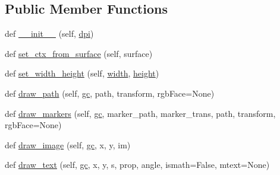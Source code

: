 \subsection*{Public Member Functions}
\begin{DoxyCompactItemize}
\item 
def \hyperlink{classmatplotlib_1_1backends_1_1backend__cairo_1_1RendererCairo_a836a4e533990c7fbd6368b9149657148}{\+\_\+\+\_\+init\+\_\+\+\_\+} (self, \hyperlink{classmatplotlib_1_1backends_1_1backend__cairo_1_1RendererCairo_a731be1d5833fc0e1e2ca270264b4f528}{dpi})
\item 
def \hyperlink{classmatplotlib_1_1backends_1_1backend__cairo_1_1RendererCairo_aba6c3080115929e5929f4912b459ac52}{set\+\_\+ctx\+\_\+from\+\_\+surface} (self, surface)
\item 
def \hyperlink{classmatplotlib_1_1backends_1_1backend__cairo_1_1RendererCairo_a0424cf9fe02553c1e7d91e875afa3b3e}{set\+\_\+width\+\_\+height} (self, \hyperlink{classmatplotlib_1_1backends_1_1backend__cairo_1_1RendererCairo_ae394da8b90802a9c233cfbdcf8974c0d}{width}, \hyperlink{classmatplotlib_1_1backends_1_1backend__cairo_1_1RendererCairo_a0d8ef711f54f5a5bad4a4e72fd583335}{height})
\item 
def \hyperlink{classmatplotlib_1_1backends_1_1backend__cairo_1_1RendererCairo_a1ebd08b6c16c8b36ab8e40818fd65bd0}{draw\+\_\+path} (self, \hyperlink{classmatplotlib_1_1backends_1_1backend__cairo_1_1RendererCairo_ae780c7b41d12dd30c0ed2b7d6aba7f47}{gc}, path, transform, rgb\+Face=None)
\item 
def \hyperlink{classmatplotlib_1_1backends_1_1backend__cairo_1_1RendererCairo_a579273c556c1a18d0fc4801985f0503b}{draw\+\_\+markers} (self, \hyperlink{classmatplotlib_1_1backends_1_1backend__cairo_1_1RendererCairo_ae780c7b41d12dd30c0ed2b7d6aba7f47}{gc}, marker\+\_\+path, marker\+\_\+trans, path, transform, rgb\+Face=None)
\item 
def \hyperlink{classmatplotlib_1_1backends_1_1backend__cairo_1_1RendererCairo_afccd206254ad623416d14e6476223b93}{draw\+\_\+image} (self, \hyperlink{classmatplotlib_1_1backends_1_1backend__cairo_1_1RendererCairo_ae780c7b41d12dd30c0ed2b7d6aba7f47}{gc}, x, y, im)
\item 
def \hyperlink{classmatplotlib_1_1backends_1_1backend__cairo_1_1RendererCairo_a9a93e00fd6fc37d8e9a37ed951800632}{draw\+\_\+text} (self, \hyperlink{classmatplotlib_1_1backends_1_1backend__cairo_1_1RendererCairo_ae780c7b41d12dd30c0ed2b7d6aba7f47}{gc}, x, y, s, prop, angle, ismath=False, mtext=None)
\item 

\end{DoxyCompactItemize}
